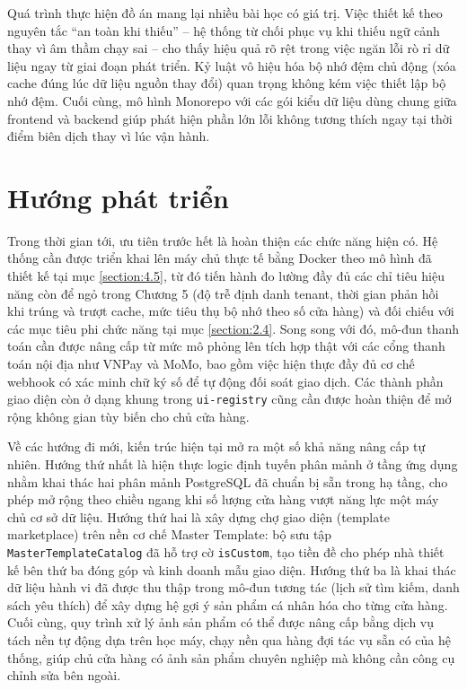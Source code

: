 \documentclass[../main.tex]{subfiles}
\begin{document}
Quá trình thực hiện đồ án mang lại nhiều bài học có giá trị. Việc thiết kế theo nguyên tắc ``an toàn khi thiếu'' -- hệ thống từ chối phục vụ khi thiếu ngữ cảnh thay vì âm thầm chạy sai -- cho thấy hiệu quả rõ rệt trong việc ngăn lỗi rò rỉ dữ liệu ngay từ giai đoạn phát triển. Kỷ luật vô hiệu hóa bộ nhớ đệm chủ động (xóa cache đúng lúc dữ liệu nguồn thay đổi) quan trọng không kém việc thiết lập bộ nhớ đệm. Cuối cùng, mô hình Monorepo với các gói kiểu dữ liệu dùng chung giữa frontend và backend giúp phát hiện phần lớn lỗi không tương thích ngay tại thời điểm biên dịch thay vì lúc vận hành.

\section{Hướng phát triển}
\label{section:6.2}

Trong thời gian tới, ưu tiên trước hết là hoàn thiện các chức năng hiện có. Hệ thống cần được triển khai lên máy chủ thực tế bằng Docker theo mô hình đã thiết kế tại mục \ref{section:4.5}, từ đó tiến hành đo lường đầy đủ các chỉ tiêu hiệu năng còn để ngỏ trong Chương 5 (độ trễ định danh tenant, thời gian phản hồi khi trúng và trượt cache, mức tiêu thụ bộ nhớ theo số cửa hàng) và đối chiếu với các mục tiêu phi chức năng tại mục \ref{section:2.4}. Song song với đó, mô-đun thanh toán cần được nâng cấp từ mức mô phỏng lên tích hợp thật với các cổng thanh toán nội địa như VNPay và MoMo, bao gồm việc hiện thực đầy đủ cơ chế webhook có xác minh chữ ký số để tự động đối soát giao dịch. Các thành phần giao diện còn ở dạng khung trong \texttt{ui-registry} cũng cần được hoàn thiện để mở rộng không gian tùy biến cho chủ cửa hàng.

Về các hướng đi mới, kiến trúc hiện tại mở ra một số khả năng nâng cấp tự nhiên. Hướng thứ nhất là hiện thực logic định tuyến phân mảnh ở tầng ứng dụng nhằm khai thác hai phân mảnh PostgreSQL đã chuẩn bị sẵn trong hạ tầng, cho phép mở rộng theo chiều ngang khi số lượng cửa hàng vượt năng lực một máy chủ cơ sở dữ liệu. Hướng thứ hai là xây dựng chợ giao diện (template marketplace) trên nền cơ chế Master Template: bộ sưu tập \texttt{MasterTemplateCatalog} đã hỗ trợ cờ \texttt{isCustom}, tạo tiền đề cho phép nhà thiết kế bên thứ ba đóng góp và kinh doanh mẫu giao diện. Hướng thứ ba là khai thác dữ liệu hành vi đã được thu thập trong mô-đun tương tác (lịch sử tìm kiếm, danh sách yêu thích) để xây dựng hệ gợi ý sản phẩm cá nhân hóa cho từng cửa hàng. Cuối cùng, quy trình xử lý ảnh sản phẩm có thể được nâng cấp bằng dịch vụ tách nền tự động dựa trên học máy, chạy nền qua hàng đợi tác vụ sẵn có của hệ thống, giúp chủ cửa hàng có ảnh sản phẩm chuyên nghiệp mà không cần công cụ chỉnh sửa bên ngoài.
\end{document}
